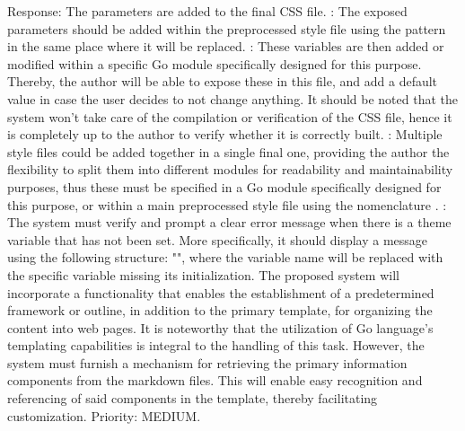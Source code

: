 {}Response: The parameters are added to the final CSS file.\markdownRendererInterblockSeparator
{}: The exposed parameters should be added within the preprocessed style file using the pattern  in the same place where it will be replaced.\markdownRendererInterblockSeparator
{}: These variables are then added or modified within a specific Go module specifically designed for this purpose. Thereby, the author will be able to expose these in this file, and add a default value in case the user decides to not change anything. It should be noted that the system won't take care of the compilation or verification of the CSS file, hence it is completely up to the author to verify whether it is correctly built.\markdownRendererInterblockSeparator
{}: Multiple style files could be added together in a single final one, providing the author the flexibility to split them into different modules for readability and maintainability purposes, thus these must be specified in a Go module specifically designed for this purpose, or within a main preprocessed style file using the nomenclature .\markdownRendererInterblockSeparator
{}: The system must verify and prompt a clear error message when there is a theme variable that has not been set. More specifically, it should display a message using the following structure: "", where the variable name will be replaced with the specific variable missing its initialization.\markdownRendererInterblockSeparator
{}\markdownRendererInterblockSeparator
{}\markdownRendererInterblockSeparator
{}The proposed system will incorporate a functionality that enables the establishment of a predetermined framework or outline, in addition to the primary template, for organizing the content into web pages. It is noteworthy that the utilization of Go language's templating capabilities is integral to the handling of this task. However, the system must furnish a mechanism for retrieving the primary information components from the markdown files. This will enable easy recognition and referencing of said components in the template, thereby facilitating customization. Priority: MEDIUM.\markdownRendererInterblockSeparator
